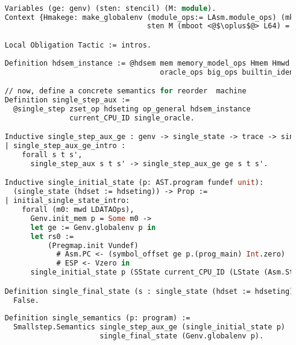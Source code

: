 \begin{lstlisting}[language=Caml]

    Variables (ge: genv) (sten: stencil) (M: module).
    Context {Hmakege: make_globalenv (module_ops:= LAsm.module_ops) (mkp_ops:= make_program_ops) 
                                     sten M (mboot <@$\oplus$@> L64) = ret ge}.

    Local Obligation Tactic := intros.
    
    Definition hdsem_instance := @hdsem mem memory_model_ops Hmem Hmwd real_params_ops oracle_ops0
                                        oracle_ops big_ops builtin_idents_norepet_prf ge sten M Hmakege.

    // now, define a concrete semantics for reorder  machine 
    Definition single_step_aux :=
      @single_step zset_op hdseting op_general hdsem_instance 
                   current_CPU_ID single_oracle.

    Inductive single_step_aux_ge : genv -> single_state -> trace -> single_state -> Prop :=
    | single_step_aux_ge_intro : 
        forall s t s',
          single_step_aux s t s' -> single_step_aux_ge ge s t s'.

    Inductive single_initial_state (p: AST.program fundef unit): 
      (single_state (hdset := hdseting)) -> Prop :=
    | initial_single_state_intro: 
        forall (m0: mwd LDATAOps),
          Genv.init_mem p = Some m0 ->
          let ge := Genv.globalenv p in
          let rs0 :=
              (Pregmap.init Vundef)
                # Asm.PC <- (symbol_offset ge p.(prog_main) Int.zero)
                # ESP <- Vzero in
          single_initial_state p (SState current_CPU_ID (LState (Asm.State rs0 m0) true) nil).

    Definition single_final_state (s : single_state (hdset := hdseting)) (i : int) : Prop :=
      False.
      
    Definition single_semantics (p: program) :=
      Smallstep.Semantics single_step_aux_ge (single_initial_state p) 
                          single_final_state (Genv.globalenv p).

\end{lstlisting}


\begin{lstlisting}[language=Caml]
\end{lstlisting}

\begin{lstlisting}[language=Caml]
\end{lstlisting}

